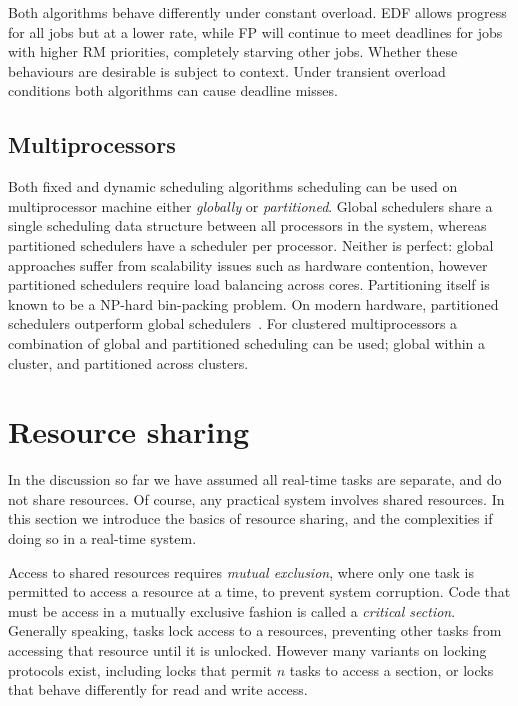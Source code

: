 Both algorithms behave differently under constant
overload. \gls{EDF} allows progress for all jobs but at a lower rate, while \gls{FP} will
continue to meet deadlines for jobs with higher \gls{RM} priorities, completely starving other
jobs. Whether these behaviours are desirable is subject to context.  Under
transient overload conditions both algorithms can cause deadline misses.


\subsection{Multiprocessors}

Both fixed and dynamic scheduling algorithms scheduling can be used on multiprocessor machine either
\emph{globally} or \emph{partitioned}. Global schedulers share a single scheduling data structure
between all processors in the system, whereas partitioned schedulers have a scheduler per processor.
Neither is perfect: global approaches suffer from scalability issues such as hardware contention,
however partitioned schedulers require load balancing across cores.  Partitioning itself is known to
be a NP-hard bin-packing problem.  On modern hardware, partitioned schedulers outperform global
schedulers~\citep{Brandenburg:phd}.  For clustered multiprocessors a combination of global and
partitioned scheduling can be used; global within a cluster, and partitioned across clusters.

\section{Resource sharing}
\label{sec:resource-sharing-theory}

In the discussion so far we have assumed all real-time tasks are separate, and do not share resources.
Of course, any practical system involves shared resources. In this section we introduce the basics
of resource sharing, and the complexities if doing so in a real-time system.

Access to shared resources requires \emph{mutual exclusion}, where only one 
task is permitted to access a resource at a time, to prevent system corruption. Code that
must be access in a mutually exclusive fashion is called a \emph{critical section}. Generally
speaking, tasks lock access to a resources, preventing other tasks from accessing that resource
until it is unlocked. However many variants on locking protocols exist, including locks that permit
$n$ tasks to access a section, or locks that behave differently for read and write access.

